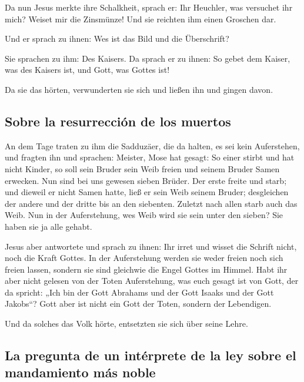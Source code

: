 Da nun Jesus merkte ihre Schalkheit, sprach er: Ihr
Heuchler, was versuchet ihr mich?  Weiset mir die
Zinsmünze! Und sie reichten ihm einen Groschen dar.

 Und er sprach zu ihnen: Wes ist das Bild und die
Überschrift?

 Sie sprachen zu ihm: Des Kaisers. Da sprach er zu ihnen:
So gebet dem Kaiser, was des Kaisers ist, und Gott, was Gottes ist!

 Da sie das hörten, verwunderten sie sich und ließen ihn
und gingen davon.

\hypertarget{sobre-la-resurrecciuxf3n-de-los-muertos}{%
\subsection{Sobre la resurrección de los
muertos}\label{sobre-la-resurrecciuxf3n-de-los-muertos}}

 An dem Tage traten zu ihm die Sadduzäer, die da halten,
es sei kein Auferstehen, und fragten ihn  und sprachen:
Meister, Mose hat gesagt: So einer stirbt und hat nicht Kinder, so soll
sein Bruder sein Weib freien und seinem Bruder Samen erwecken.
 Nun sind bei uns gewesen sieben Brüder. Der erste freite
und starb; und dieweil er nicht Samen hatte, ließ er sein Weib seinem
Bruder;  desgleichen der andere und der dritte bis an den
siebenten.  Zuletzt nach allen starb auch das Weib.
 Nun in der Auferstehung, wes Weib wird sie sein unter
den sieben? Sie haben sie ja alle gehabt.

 Jesus aber antwortete und sprach zu ihnen: Ihr irret und
wisset die Schrift nicht, noch die Kraft Gottes.  In der
Auferstehung werden sie weder freien noch sich freien lassen, sondern
sie sind gleichwie die Engel Gottes im Himmel.  Habt ihr
aber nicht gelesen von der Toten Auferstehung, was euch gesagt ist von
Gott, der da spricht:  „Ich bin der Gott Abrahams und der
Gott Isaaks und der Gott Jakobs``? Gott aber ist nicht ein Gott der
Toten, sondern der Lebendigen.

 Und da solches das Volk hörte, entsetzten sie sich über
seine Lehre.

\hypertarget{la-pregunta-de-un-intuxe9rprete-de-la-ley-sobre-el-mandamiento-muxe1s-noble}{%
\subsection{La pregunta de un intérprete de la ley sobre el mandamiento
más
noble}\label{la-pregunta-de-un-intuxe9rprete-de-la-ley-sobre-el-mandamiento-muxe1s-noble}}

